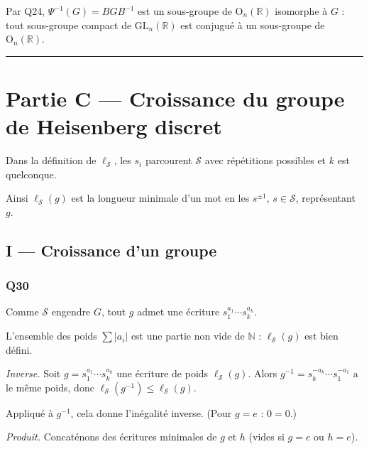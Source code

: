 \documentclass[11pt,a4paper]{article}
\newcommand{\equationajustee}[1]{%
  \sbox{\boiteequation}{$\displaystyle #1$}%
  \ifdim\wd\boiteequation>\linewidth
    \[\resizebox{\linewidth}{!}{\usebox{\boiteequation}}\]%
  \else
    \[#1\]%
  \fi}
\begin{document}
\equationajustee{\boxed{G\ \text{est un sous-groupe de}\ \mathrm{O}(A).}}

Par Q24, \(\Psi^{-1}(G)=BGB^{-1}\) est un sous-groupe de \({\mathrm{O}}_n(\mathbb{R})\) isomorphe à \(G\) : tout sous-groupe compact de \({\mathrm{GL}}_n(\mathbb{R})\) est conjugué à un sous-groupe de \({\mathrm{O}}_n(\mathbb{R})\).

\begin{center}\rule{0.5\linewidth}{0.5pt}\end{center}

\hypertarget{partie-c-croissance-du-groupe-de-heisenberg-discret}{%
\section{Partie C --- Croissance du groupe de Heisenberg discret}\label{partie-c-croissance-du-groupe-de-heisenberg-discret}}

Dans la définition de \(\ell_{\mathcal{S}}\), les \(s_i\) parcourent \(\mathcal{S}\) avec répétitions possibles et \(k\) est quelconque.

Ainsi \(\ell_{\mathcal{S}}(g)\) est la longueur minimale d'un mot en les \(s^{\pm1}\), \(s\in\mathcal{S}\), représentant \(g\).

\hypertarget{i-croissance-dun-groupe}{%
\subsection{I --- Croissance d'un groupe}\label{i-croissance-dun-groupe}}

\hypertarget{q30}{%
\subsubsection{Q30}\label{q30}}

Comme \(\mathcal{S}\) engendre \(G\), tout \(g\) admet une écriture \(s_1^{a_1}\cdots s_k^{a_k}\).

L'ensemble des poids \(\sum|a_i|\) est une partie non vide de \(\mathbb{N}\) : \(\ell_{\mathcal{S}}(g)\) est bien défini.

\emph{Inverse.} Soit \(g=s_1^{a_1}\cdots s_k^{a_k}\) une écriture de poids \(\ell_{\mathcal{S}}(g)\). Alors \(g^{-1}=s_k^{-a_k}\cdots s_1^{-a_1}\) a le même poids, donc \(\ell_{\mathcal{S}}(g^{-1})\leqslant\ell_{\mathcal{S}}(g)\).

Appliqué à \(g^{-1}\), cela donne l'inégalité inverse. (Pour \(g=e\) : \(0=0\).)

\emph{Produit.} Concaténons des écritures minimales de \(g\) et \(h\) (vides si \(g=e\) ou \(h=e\)).
\end{document}
